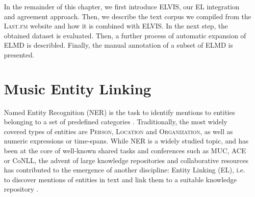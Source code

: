 

In the remainder of this chapter, we first introduce \textsc{ELVIS}, our EL integration and agreement approach. Then, we describe the text corpus we compiled from the \textsc{Last.fm} website and how it is combined with ELVIS. In the next step, the obtained dataset is evaluated. Then, a further process of automatic expansion of \textsc{ELMD} is describled. Finally, the manual annotation of a subset of \textsc{ELMD} is presented. %


\section{Music Entity Linking}
\label{sec:linking:el}


Named Entity Recognition (NER) is the task to identify mentions to entities belonging to a set of predefined categories \cite{ZhouandJian2002}. Traditionally, the most widely covered types of entities are \textsc{Person}, \textsc{Location} and \textsc{Organization}, as well as numeric expressions or time-spans. While NER is a widely studied topic, and has been at the core of well-known shared tasks and conferences \cite{Nadeau2007} such as MUC, ACE or CoNLL, the advent of large knowledge repositories and collaborative resources has contributed to the emergence of another discipline: Entity Linking (EL), i.e. to discover mentions of entities in text and link them to a suitable knowledge repository \cite{Moroetal2014}.

